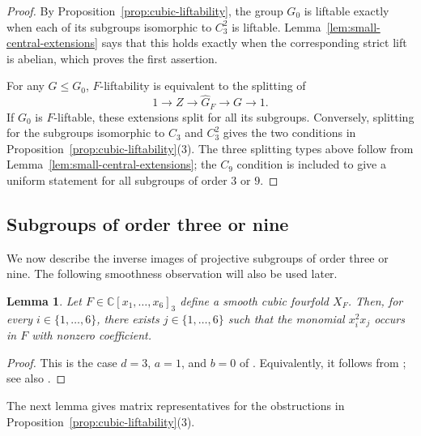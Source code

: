\documentclass[12pt]{amsart}
\numberwithin{equation}{section}
\theoremstyle{plain}
\newtheorem{lem}[thm]{Lemma}
\theoremstyle{definition}
\theoremstyle{remark}
\newcommand{\CC}{\mathbb C}
\begin{document}
\begin{proof}
By Proposition~\ref{prop:cubic-liftability}, the group $G_0$ is liftable
exactly when each of its subgroups isomorphic to $C_3^2$ is liftable.
Lemma~\ref{lem:small-central-extensions} says that this holds exactly when
the corresponding strict lift is abelian, which proves the first
assertion.

For any $G\leq G_0$, $F$-liftability is equivalent to the splitting of
\[
1\longrightarrow Z\longrightarrow\widehat G_F
\longrightarrow G\longrightarrow1.
\]
If $G_0$ is $F$-liftable, these extensions split for all its subgroups.
Conversely, splitting for the subgroups isomorphic to $C_3$ and $C_3^2$
gives the two conditions in Proposition~\ref{prop:cubic-liftability}(3).
The three splitting types above follow from
Lemma~\ref{lem:small-central-extensions}; the $C_9$ condition is included
to give a uniform statement for all subgroups of order $3$ or $9$.
\end{proof}

\subsection{Subgroups of order three or nine}

We now describe the inverse images of projective subgroups of order three
or nine. The following smoothness observation will also be used later.

\begin{lem}\label{lem:square-monomial}
Let $F\in\CC[x_1,\ldots,x_6]_3$ define a smooth cubic fourfold $X_F$.
Then, for every
$i\in\{1,\ldots,6\}$, there exists $j\in\{1,\ldots,6\}$
such that the monomial $x_i^2x_j$
occurs in $F$ with nonzero coefficient.
\end{lem}
\begin{proof}
This is the case $d=3$, $a=1$, and $b=0$ of
\cite[Lemma~4.1]{Zheng2020OnAA}.  Equivalently, it follows
from \cite[Lemma~2.3]{gonzalez2011automorphisms}; see also
\cite[Lemma~1]{mayanskiy2013abelianautomorphismgroupscubic}.
\end{proof}

The next lemma gives matrix representatives for the obstructions in
Proposition~\ref{prop:cubic-liftability}(3).
\end{document}
